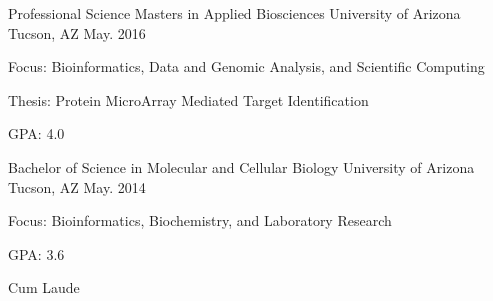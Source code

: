 

\begin{cventries}

    \cventry
    {Professional Science Masters in Applied Biosciences} %
    {University of Arizona} %
    {Tucson, AZ} %
    {May. 2016} %
    {
        \begin{cvitems} %
            \item {Focus: Bioinformatics, Data and Genomic Analysis, and Scientific Computing}
            \item {Thesis: Protein MicroArray Mediated Target Identification}
            \item {GPA: 4.0}
        \end{cvitems}
    }
    \cventry
    {Bachelor of Science in Molecular and Cellular Biology} %
    {University of Arizona} %
    {Tucson, AZ} %
    {May. 2014} %
    {
        \begin{cvitems} %
            \item {Focus: Bioinformatics, Biochemistry, and Laboratory Research}
            \item {GPA: 3.6}
            \item {Cum Laude}
        \end{cvitems}
    }
\end{cventries}
